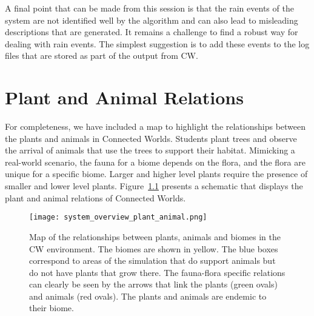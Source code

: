 \begin{appendices}
A final point that can be made from this session is that the rain events of the system are not identified well by the algorithm and can also lead to misleading descriptions that are generated. It remains a challenge to find a robust way for dealing with rain events. The simplest suggestion is to add these events to the log files that are stored as part of the output from CW.





\chapter{Plant and Animal Relations}\label{cha:appendix2}
For completeness, we have included a map to highlight the relationships between the plants and animals in Connected Worlds. Students plant trees and observe the arrival of animals that use the trees to support their habitat. Mimicking a real-world scenario, the fauna for a biome depends on the flora, and the flora are unique for a specific biome. Larger and higher level plants require the presence of smaller and lower level plants. Figure~\ref{fig:system_overview_plant_animal} presents a schematic that displays the plant and animal relations of Connected Worlds.

\begin{figure}
\centering
\texttt{[image: system\_overview\_plant\_animal.png]}
\caption{Map of the relationships between plants, animals and biomes in the CW environment. The biomes are shown in yellow. The blue boxes correspond to areas of the simulation that do support animals but do not have plants that grow there. The fauna-flora specific relations can clearly be seen by the arrows that link the plants (green ovals) and animals (red ovals). The plants and animals are endemic to their biome.}
\label{fig:system_overview_plant_animal}
\end{figure}

\end{appendices}
